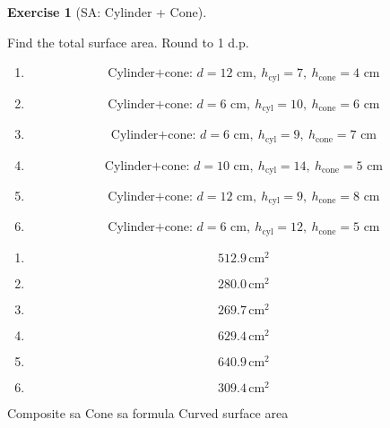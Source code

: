 \documentclass[
  letterpaper,
  DIV=11,
  numbers=noendperiod]{scrreprt}
\theoremstyle{definition}
\newtheorem{exercise}{Exercise}[chapter]
\theoremstyle{remark}
\begin{document}
\begin{exercise}[SA: Cylinder +
Cone]\protect\hypertarget{exr-sa-12}{}\label{exr-sa-12}

Find the total surface area. Round to 1 d.p.

\begin{enumerate}
\def\labelenumi{\alph{enumi})}
\item
  \[\text{Cylinder+cone: }d=12\text{ cm},\ h_{\text{cyl}}=7,\ h_{\text{cone}}=4\text{ cm}\]
\item
  \[\text{Cylinder+cone: }d=6\text{ cm},\ h_{\text{cyl}}=10,\ h_{\text{cone}}=6\text{ cm}\]
\item
  \[\text{Cylinder+cone: }d=6\text{ cm},\ h_{\text{cyl}}=9,\ h_{\text{cone}}=7\text{ cm}\]
\item
  \[\text{Cylinder+cone: }d=10\text{ cm},\ h_{\text{cyl}}=14,\ h_{\text{cone}}=5\text{ cm}\]
\item
  \[\text{Cylinder+cone: }d=12\text{ cm},\ h_{\text{cyl}}=9,\ h_{\text{cone}}=8\text{ cm}\]
\item
  \[\text{Cylinder+cone: }d=6\text{ cm},\ h_{\text{cyl}}=12,\ h_{\text{cone}}=5\text{ cm}\]
\end{enumerate}

\begin{tcolorbox}[enhanced jigsaw, opacitybacktitle=0.6, coltitle=black, arc=.35mm, colframe=quarto-callout-tip-color-frame, colback=white, bottomrule=.15mm, left=2mm, colbacktitle=quarto-callout-tip-color!10!white, titlerule=0mm, opacityback=0, title=\textcolor{quarto-callout-tip-color}{\faLightbulb}\hspace{0.5em}{🔍 View Solution}, leftrule=.75mm, breakable, rightrule=.15mm, bottomtitle=1mm, toptitle=1mm, toprule=.15mm]

\begin{enumerate}
\def\labelenumi{\alph{enumi})}
\item
  \[512.9\,\text{cm}^{2}\]
\item
  \[280.0\,\text{cm}^{2}\]
\item
  \[269.7\,\text{cm}^{2}\]
\item
  \[629.4\,\text{cm}^{2}\]
\item
  \[640.9\,\text{cm}^{2}\]
\item
  \[309.4\,\text{cm}^{2}\]
\end{enumerate}

\end{tcolorbox}

{Composite sa} {Cone sa formula} {Curved surface area}

\end{exercise}
\end{document}
